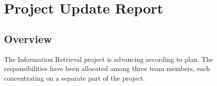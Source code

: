 \documentclass[unicode,9pt,a4paper,oneside,numbers=endperiod,openany]{scrartcl}
\begin{document}
\setassignment
{}

\newline

\section{Project Update Report}

\subsection{Overview}
The Information Retrieval project is advancing according to plan. The responsibilities have been allocated among three team members, each concentrating on a separate part of the project.
\end{document}
